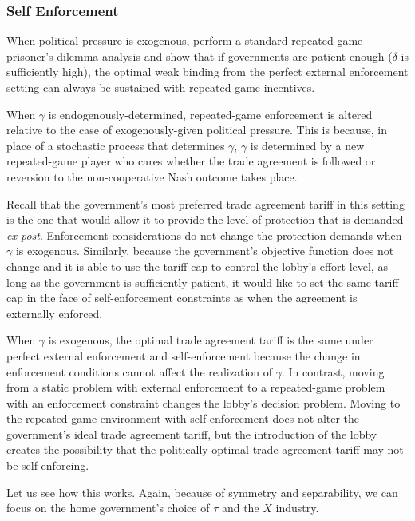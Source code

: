 \documentclass[12pt]{article}
\newcommand{\ga}{\gamma}
\newcommand{\de}{\delta}
\begin{document}
\subsubsection{Self Enforcement}
\label{sec:selfweak}
When political pressure is exogenous, \Textcite{bs2005} perform a standard repeated-game prisoner's dilemma analysis and show that if governments are patient enough ($\de$ is sufficiently high), the optimal weak binding from the perfect external enforcement setting can always be sustained with repeated-game incentives.

When $\ga$ is endogenously-determined, repeated-game enforcement is altered relative to the case of exogenously-given political pressure. This is because, in place of a stochastic process that determines $\ga$, $\ga$ is determined by a new repeated-game player who cares whether the trade agreement is followed or reversion to the non-cooperative Nash outcome takes place.

Recall that the government's most preferred trade agreement tariff in this setting is the one that would allow it to provide the level of protection that is demanded \textit{ex-post}. Enforcement considerations do not change the protection demands when $\ga$ is exogenous. Similarly, because the government's objective function does not change and it is able to use the tariff cap to control the lobby's effort level, as long as the government is sufficiently patient, it would like to set the same tariff cap in the face of self-enforcement constraints as when the agreement is externally enforced.

When $\ga$ is exogenous, the optimal trade agreement tariff is the same under perfect external enforcement and self-enforcement because the change in enforcement conditions cannot affect the realization of $\ga$. In contrast, moving from a static problem with external enforcement to a repeated-game problem with an enforcement constraint changes the lobby's decision problem. Moving to the repeated-game environment with self enforcement does not alter the government's ideal trade agreement tariff, but the introduction of the lobby creates the possibility that the politically-optimal trade agreement tariff may not be self-enforcing.

Let us see how this works. Again, because of symmetry and separability, we can focus on the home government's choice of $\tau$ and the $X$ industry.
\end{document}
